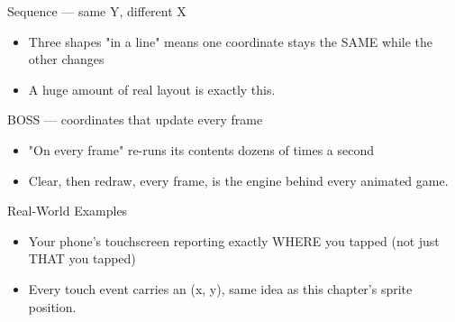 \documentclass[aspectratio=169]{beamer}
\begin{document}
\begin{frame}{Sequence — same Y, different X}
    \large
    \begin{itemize}
        \item Three shapes "in a line" means one coordinate stays the SAME while the other changes
        \item A huge amount of real layout is exactly this.
    \end{itemize}

    \begin{center}
    \end{center}
\end{frame}


\begin{frame}{BOSS — coordinates that update every frame}
    \large
    \begin{itemize}
        \item "On every frame" re-runs its contents dozens of times a second
        \item Clear, then redraw, every frame, is the engine behind every animated game.
    \end{itemize}

    \begin{center}
    \end{center}
\end{frame}

\begin{frame}{Real-World Examples}
    \large
    \begin{itemize}
        \item Your phone's touchscreen reporting exactly WHERE you tapped (not just THAT you tapped)
        \item Every touch event carries an (x, y), same idea as this chapter's sprite position.
    \end{itemize}
\end{frame}
\end{document}

